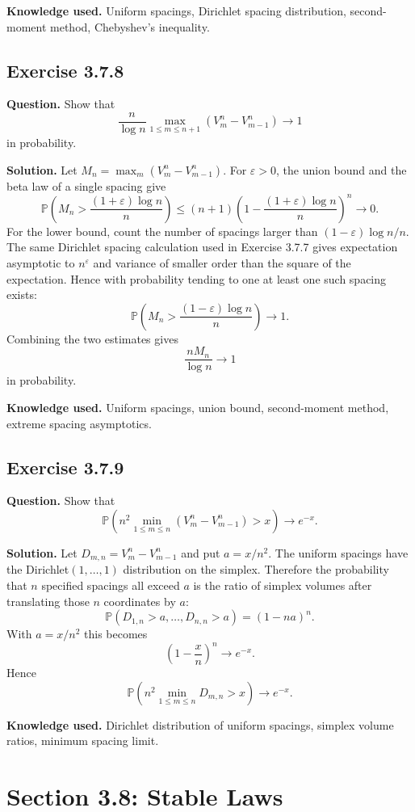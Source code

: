 \documentclass[11pt]{article}
\newcommand{\Prob}{\mathbb{P}}
\begin{document}
\textbf{Knowledge used.}
Uniform spacings, Dirichlet spacing distribution, second-moment method,
Chebyshev's inequality.

\subsection*{Exercise 3.7.8}
\textbf{Question.}
Show that
\[
  \frac{n}{\log n}\max_{1\le m\le n+1}(V^n_m-V^n_{m-1})
  \to 1
\]
in probability.

\textbf{Solution.}
Let $M_n=\max_m(V^n_m-V^n_{m-1})$.  For $\varepsilon>0$, the union bound
and the beta law of a single spacing give
\[
  \Prob\!\left(M_n>\frac{(1+\varepsilon)\log n}{n}\right)
  \le
  (n+1)\left(1-\frac{(1+\varepsilon)\log n}{n}\right)^n
  \to0.
\]
For the lower bound, count the number of spacings larger than
$(1-\varepsilon)\log n/n$.  The same Dirichlet spacing calculation used
in Exercise 3.7.7 gives expectation asymptotic to $n^\varepsilon$ and
variance of smaller order than the square of the expectation.  Hence
with probability tending to one at least one such spacing exists:
\[
  \Prob\!\left(M_n>\frac{(1-\varepsilon)\log n}{n}\right)\to1.
\]
Combining the two estimates gives
\[
  \frac{nM_n}{\log n}\to1
\]
in probability.

\textbf{Knowledge used.}
Uniform spacings, union bound, second-moment method, extreme spacing
asymptotics.

\subsection*{Exercise 3.7.9}
\textbf{Question.}
Show that
\[
  \Prob\!\left(
    n^2\min_{1\le m\le n}(V^n_m-V^n_{m-1})>x
  \right)\to e^{-x}.
\]

\textbf{Solution.}
Let $D_{m,n}=V^n_m-V^n_{m-1}$ and put $a=x/n^2$.  The uniform spacings
have the Dirichlet$(1,\ldots,1)$ distribution on the simplex.  Therefore
the probability that $n$ specified spacings all exceed $a$ is the ratio
of simplex volumes after translating those $n$ coordinates by $a$:
\[
  \Prob(D_{1,n}>a,\ldots,D_{n,n}>a)
  =
  (1-na)^n.
\]
With $a=x/n^2$ this becomes
\[
  \left(1-\frac{x}{n}\right)^n\to e^{-x}.
\]
Hence
\[
  \Prob\!\left(
    n^2\min_{1\le m\le n}D_{m,n}>x
  \right)\to e^{-x}.
\]

\textbf{Knowledge used.}
Dirichlet distribution of uniform spacings, simplex volume ratios,
minimum spacing limit.

\section*{Section 3.8: Stable Laws}
\end{document}
